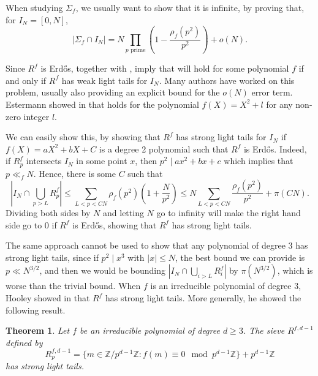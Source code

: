 \documentclass[a4paper,11pt,reqno]{amsart}
\theoremstyle{plain}
\newtheorem{theorem}{Theorem}[section]
\theoremstyle{remark}
\newcommand{\z}{\mathbb{Z}}
\begin{document}
				When studying $\Sigma_f$, we usually want to show that it is infinite, by proving that, for $I_N = [0,N]$, 
				\begin{equation}
					\label{eq: formula if squarefree polynomials }
					|\Sigma_f \cap I_N| = N\prod_{p \text{ prime}} \left(1-\frac{\rho_f(p^2)}{p^2}\right) + o(N).
				\end{equation}
				
				Since $R^f$ is Erdős,  together with , imply that  will hold for some polynomial $f$ if and only if $R^f$ has weak light tails for $I_N$. Many authors have worked on this problem, usually also providing an explicit bound for the $o(N)$ error term. Estermann showed in \cite{estermann} that  holds for the polynomial $f(X) = X^2+l$ for any non-zero integer $l$. 
				
				We can easily show this, by showing that $R^f$ has strong light tails for $I_N$ if $f(X) = aX^2+bX+C$ is a degree 2 polynomial such that $R^f$ is Erdős. Indeed, if $R^f_p$ intersects $I_N$ in some point $x$, then $p^2\mid ax^2+bx+c$ which implies that $p \ll_f N$. Hence, there is some $C$ such that $$\left|I_N \cap \bigcup_{p> L}R^f_p\right| \leq \sum_{L < p < CN}\rho_f(p^2)\left(1+\frac{N}{p^2} \right) \leq N\sum_{L < p < CN}\frac{\rho_f(p^2)}{p^2} + \pi(CN). $$ Dividing both sides by $N$ and letting $N$ go to infinity will make the right hand side go to $0$ if $R^f$ is Erdős, showing that $R^f$ has strong light tails.
				
				The same approach cannot be used to show that any polynomial of degree $3$ has strong light tails, since if $p^2 \mid x^3$ with $|x| \leq N$, the best bound we can provide is $p \ll N^{3/2}$, and then we would be bounding $\left|I_N \cap \bigcup_{i> L}R^f_i\right|$ by $\pi(N^{3/2})$, which is worse than the trivial bound. When $f$ is an irreducible polynomial of degree $3$, Hooley showed in \cite{Hooley 2} that $R^f$ has strong light tails. More generally, he showed the following result.
				
				\begin{theorem}
					\label{thm: Hooley Polynomials}
					Let $f$ be an irreducible polynomial of degree $d \geq 3$. The sieve $R^{f,d-1}$ defined by $$R^{f,d-1}_p = \{m \in \z/p^{d-1}\z: f(m) \equiv 0 \mod p^{d-1}\z \} + p^{d-1}\z$$ has strong light tails.
				\end{theorem}
				
\end{document}
